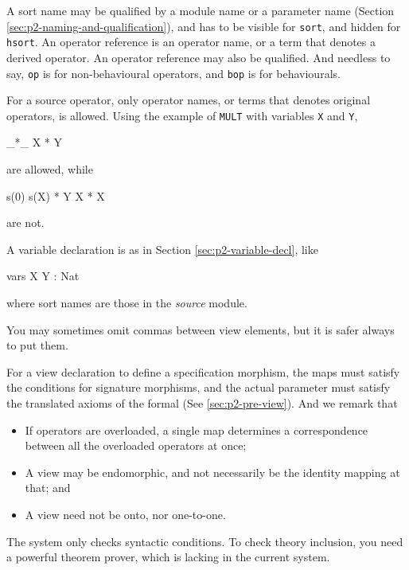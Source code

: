 \documentclass[a4paper]{memoir}
\begin{document}
A sort name may be qualified by a module name or a parameter name
(Section \ref{sec:p2-naming-and-qualification}),
and has to be visible for \verb|sort|, and hidden for \verb|hsort|.
An operator reference is an operator name, or a term that denotes
a derived operator. An operator reference may also be qualified. And
needless to say, \verb|op| is for non-behavioural operators, and
\verb|bop| is for behaviourals.

For a source operator, only operator names, or terms that denotes
original operators, is allowed. Using the example of \verb|MULT|
with variables \verb|X| and \verb|Y|,
\begin{vvtm}
\begin{ccode}
  _*_
  X * Y
\end{ccode}
\end{vvtm}
are allowed, while
\begin{vvtm}
\begin{ccode}
  s(0)
  s(X) * Y
  X * X
\end{ccode}
\end{vvtm}
are not.

A variable declaration is as in Section \ref{sec:p2-variable-decl}, like
\begin{vvtm}
\begin{ccode}
  vars X Y : Nat
\end{ccode}
\end{vvtm}
where sort names are those in the {\em source} module.

\begin{warning}
  You may sometimes omit commas between view elements, but it is
  safer always to put them.
\end{warning}

For a view declaration to define a specification morphism, the maps
must satisfy the conditions for signature morphisms, and
the actual parameter must satisfy the translated axioms of the formal
(See \ref{sec:p2-pre-view}). And we remark that
\begin{itemize}
\item If operators are
  overloaded, a single map determines a correspondence between all the
  overloaded operators at once;
\item A view may be endomorphic, and not necessarily be the identity mapping
  at that; and
\item A view need not be onto, nor one-to-one.
\end{itemize}

\begin{warning}
  The system only checks syntactic conditions. To check theory inclusion,
  you need a powerful theorem prover, which is lacking in the current
  system.
\end{warning}
\end{document}
